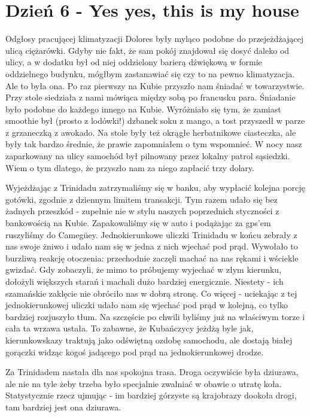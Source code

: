 
\chapter[Yes yes, this is my house]{Dzień 6 - Yes yes, this is my house}

Odgłosy pracującej klimatyzacji Dolores były myląco podobne do przejeżdżającej ulicą ciężarówki. 
Gdyby nie fakt, że sam pokój znajdował się dosyć daleko od ulicy, a w dodatku był od niej oddzielony barierą dźwiękową w formie oddzielnego budynku, mógłbym zastanawiać się czy to na pewno klimatyzacja. 
Ale to była ona.
Po raz pierwszy na Kubie przyszło nam śniadać w towarzystwie.
Przy stole siedziała z nami mówiąca między sobą po francusku para.
Śniadanie było podobne do każdego innego na Kubie. 
Wyróżniało się tym, że zamiast smoothie był (prosto z lodówki!) dzbanek soku z mango, a tost przyszedł w parze z grzaneczką z awokado. 
Na stole były też okrągłe herbatnikowe ciasteczka, ale były tak bardzo średnie, że prawie zapomniałem o tym wspomnieć.
W nocy nasz zaparkowany na ulicy samochód był pilnowany przez lokalny patrol sąsiedzki. 
Wiem o tym dlatego, że przyszło nam za niego zapłacić trzy dolary.
\par Wyjeżdżając z Trinidadu zatrzymaliśmy się w banku, aby wypłacić kolejna porcję gotówki, zgodnie z dziennym limitem transakcji. 
Tym razem udało się bez żadnych przeszkód - zupełnie nie w stylu naszych poprzednich styczności z bankowością na Kubie.
Zapakowaliśmy się w auto i podążając za gps’em ruszyliśmy do Camegüey. 
Jednokierunkowe uliczki Trinidadu w końcu zebrały z nas swoje żniwo i udało nam się w jedna z nich wjechać pod prąd.
Wywołało to burzliwą reakcję otoczenia: przechodnie zaczęli machać na nas rękami i wściekle gwizdać. Gdy zobaczyli, że mimo to próbujemy wyjechać w złym kierunku, dołożyli większych starań i machali dużo bardziej energicznie. Niestety - ich szamańskie zaklęcie nie obróciło nas w dobrą stronę.
Co więcej - uciekając z tej jednokierunkowej uliczki udało nam się wjechać pod prąd w kolejną, co tylko bardziej rozjuszyło tłum. 
Na szczęście po chwili byliśmy już na właściwym torze i cała ta wrzawa ustała. 
To zabawne, że Kubańczycy jeżdżą byle jak, kierunkowskazy traktują jako odświętną ozdobę samochodu, ale dostają białej gorączki widząc kogoś jadącego pod prąd na jednokierunkowej drodze. 
\par Za Trinidadem nastała dla nas spokojna trasa.
Droga oczywiście była dziurawa, ale nie na tyle żeby trzeba było specjalnie zwalniać w obawie o utratę koła. 
Statystycznie rzecz ujmując - im bardziej górzyste są krajobrazy dookoła drogi, tam bardziej jest ona dziurawa.
